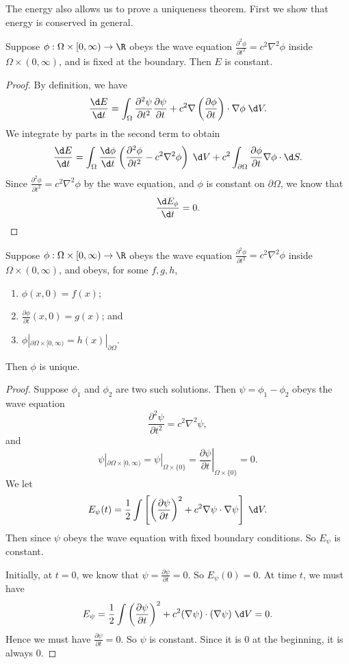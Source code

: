 \documentclass[a4paper]{article}
\begin{document}
The energy also allows us to prove a uniqueness theorem. First we show that energy is conserved in general.

\begin{prop}
  Suppose $\phi: \Omega \times [0, \infty) \to \R$ obeys the wave equation $\frac{\partial^2 \phi}{\partial t^2} = c^2 \nabla^2 \phi$ inside $\Omega \times (0, \infty)$, and is fixed at the boundary. Then $E$ is constant.
\end{prop}

\begin{proof}
  By definition, we have
  \[
    \frac{\d E}{\d t} = \int_\Omega \frac{\partial^2 \psi}{\partial t^2}\frac{\partial \psi}{\partial t} + c^2 \nabla \left(\frac{\partial \phi}{\partial t}\right)\cdot \nabla \phi \;\d V.
  \]
  We integrate by parts in the second term to obtain
  \[
    \frac{\d E}{\d t} = \int_\Omega \frac{\d \phi}{\d t}\left(\frac{\partial^2 \phi}{\partial t^2} - c^2 \nabla^2 \phi\right)\;\d V + c^2 \int_{\partial \Omega} \frac{\partial \phi}{\partial t}\nabla \phi \cdot \d S.
  \]
  Since $\frac{\partial^2 \phi}{\partial t^2} = c^2 \nabla^2 \phi$ by the wave equation, and $\phi$ is constant on $\partial \Omega$, we know that
  \[
    \frac{\d E_\phi}{\d t} = 0.
  \]
\end{proof}

\begin{prop}
  Suppose $\phi: \Omega \times [0, \infty) \to \R$ obeys the wave equation $\frac{\partial^2 \phi}{\partial t^2} = c^2 \nabla^2 \phi$ inside $\Omega \times (0, \infty)$, and obeys, for some $f, g, h$,
  \begin{enumerate}
    \item $\phi(x, 0) = f(x)$;
    \item $\frac{\partial \phi}{\partial t}(x, 0) = g(x)$; and
    \item $\phi|_{\partial \Omega\times [0, \infty)} = h(x)|_{\partial \Omega}$.
  \end{enumerate}
  Then $\phi$ is unique.
\end{prop}
\begin{proof}
  Suppose $\phi_1$ and $\phi_2$ are two such solutions. Then $\psi = \phi_1 - \phi_2$ obeys the wave equation
  \[
    \frac{\partial^2 \psi}{\partial t^2} = c^2 \nabla^2 \psi,
  \]
  and 
  \[
    \psi|_{\partial \Omega \times [0, \infty)} = \psi|_{\Omega \times \{0\}} = \left.\frac{\partial \psi}{\partial t}\right|_{\Omega \times \{0\}} = 0.
  \]
  We let
  \[
    E_\psi(t) = \frac{1}{2}\int \left[\left(\frac{\partial \psi}{\partial t}\right)^2 + c^2 \nabla \psi \cdot \nabla \psi\right] \;\d V.
  \]
  Then since $\psi$ obeys the wave equation with fixed boundary conditions. So $E_\psi$ is constant.

  Initially, at $t = 0$, we know that $\psi = \frac{\partial \psi}{\partial t} = 0$. So $E_\psi(0) = 0$. At time $t$, we must have
  \[
    E_\psi = \frac{1}{2}\int \left(\frac{\partial \psi}{\partial t}\right)^2 + c^2 (\nabla \psi)\cdot (\nabla \psi) \;\d V = 0.
  \]
  Hence we must have $\frac{\partial \psi}{\partial t} = 0$. So $\psi$ is constant. Since it is $0$ at the beginning, it is always $0$.
\end{proof}
\end{document}
